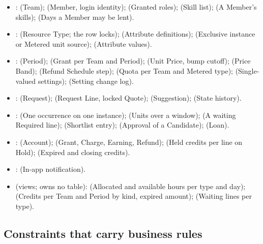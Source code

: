 {\footnotesize
\begin{itemize}
\item {}:  (Team);  (Member, login identity);  (Granted roles);  (Skill list);  (A Member's skills);  (Days a Member may be lent).
\item {}:  (Resource Type; the row  locks);  (Attribute definitions);  (Exclusive instance or Metered unit source);  (Attribute values).
\item {}:  (Period);  (Grant per Team and Period);  (Unit Price, bump cutoff);  (Price Band);  (Refund Schedule step);  (Quota per Team and Metered type);  (Single-valued settings);  (Setting change log).
\item {}:  (Request);  (Request Line, locked Quote);  (Suggestion);  (State history).
\item {}:  (One occurrence on one instance);  (Units over a window);  (A waiting Required line);  (Shortlist entry);  (Approval of a Candidate);  (Loan).
\item {}:  (Account);  (Grant, Charge, Earning, Refund);  (Held credits per line on Hold);  (Expired and closing credits).
\item {}:  (In-app notification).
\item {} (views; owns no table):  (Allocated and available hours per type and day);  (Credits per Team and Period by kind, expired amount);  (Waiting lines per type).
\end{itemize}
}

\subsection{Constraints that carry business rules}

